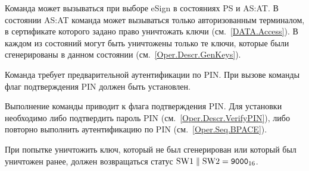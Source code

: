 Команда может вызываться при выборе eSign в состояниях 
PS и AS:AT. В состоянии AS:AT команда может вызываться только
авторизованным терминалом, в сертификате которого задано право
уничтожать ключи (см.~\ref{DATA.Access}).
В каждом из состояний могут быть уничтожены только те ключи, которые
были сгенерированы в данном состоянии (см.~\ref{Oper.Descr.GenKeys}).

Команда требует предварительной аутентификации по PIN. 
При вызове команды флаг подтверждения PIN должен быть установлен.

Выполнение команды приводит к  флага подтверждения PIN.
Для установки  необходимо либо подтвердить пароль PIN 
(см.~\ref{Oper.Descr.VerifyPIN}), либо повторно выполнить аутентификацию по PIN 
(см.~\ref{Oper.Seq.BPACE}). 

При попытке уничтожить ключ, который не был сгенерирован
или который был уничтожен ранее, должен возвращаться 
статус $\text{SW1} \parallel \text{SW2} = \texttt{9000}_{16}$.